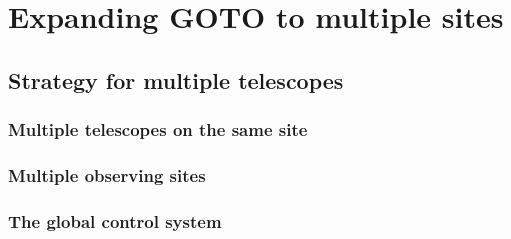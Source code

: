 \chapter{Expanding GOTO to multiple sites}
\label{chap:multiscope}
\chaptoc{}

\newpage
\section{Strategy for multiple telescopes}
\label{sec:multiscope}

\lipsum{}

\subsection{Multiple telescopes on the same site}
\label{sec:onesite}

\lipsum{}

\subsection{Multiple observing sites}
\label{sec:multisite}

\lipsum{}

\subsection{The global control system}
\label{sec:global}

\lipsum{}
